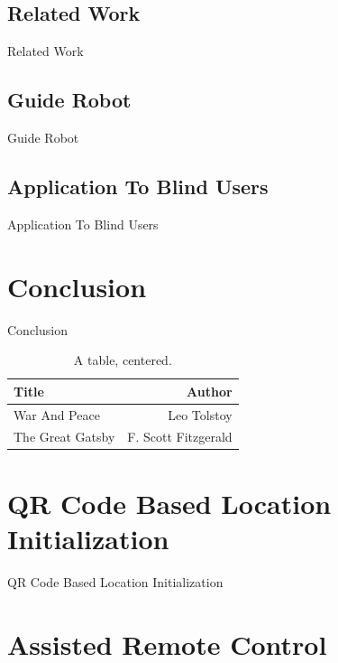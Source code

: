 \documentclass[12pt]{gatech-thesis}
\begin{document}
\section{Related Work}

Related Work

\section{Guide Robot}

Guide Robot

\section{Application To Blind Users}

Application To Blind Users


\chapter{Conclusion}

Conclusion


\begin{table}
\caption{A table, centered.}
\begin{center}
\begin{tabular}{|l|r|}
  \hline 
Title & Author \\
\hline
War And Peace & Leo Tolstoy \\
The Great Gatsby & F. Scott Fitzgerald \\ \hline
\end{tabular}
\end{center}
\end{table}





\appendix
\chapter{QR Code Based Location Initialization}

QR Code Based Location Initialization

\chapter{Assisted Remote Control}
\end{document}
